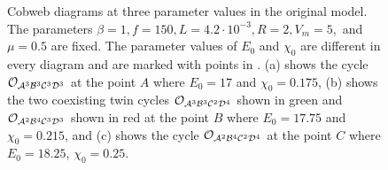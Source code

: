 \begin{figure}
	\centering
	\caption[Cobweb diagrams at three parameter values in the original model]{
		Cobweb diagrams at three parameter values in the original model.
		The parameters $\beta = 1, f = 150, L = 4.2 \cdot 10^{-3}, R = 2, V_m = 5,$ and $\mu = 0.5$ are fixed.
		The parameter values of $E_0$ and $\chi_0$ are different in every diagram and are marked with points in .
		(a) shows the cycle $\mathcal{O}_{\mathcal{A}^3\mathcal{B}^3\mathcal{C}^3\mathcal{D}^3}$ at the point $A$ where $E_0 = 17$ and $\chi_0 = 0.175$,
		(b) shows the two coexisting twin cycles $\mathcal{O}_{\mathcal{A}^3\mathcal{B}^3\mathcal{C}^2\mathcal{D}^4}$ shown in green and $\mathcal{O}_{\mathcal{A}^2\mathcal{B}^4\mathcal{C}^3\mathcal{D}^3}$ shown in red at the point $B$ where $E_0 = 17.75$ and $\chi_0 = 0.215$,
		and (c) shows the cycle $\mathcal{O}_{\mathcal{A}^2\mathcal{B}^4\mathcal{C}^2\mathcal{D}^4}$ at the point $C$ where $E_0 = 18.25$, $\chi_0 = 0.25$.
	}
	\label{fig:state.og.dynamics.cobwebs}
\end{figure}

